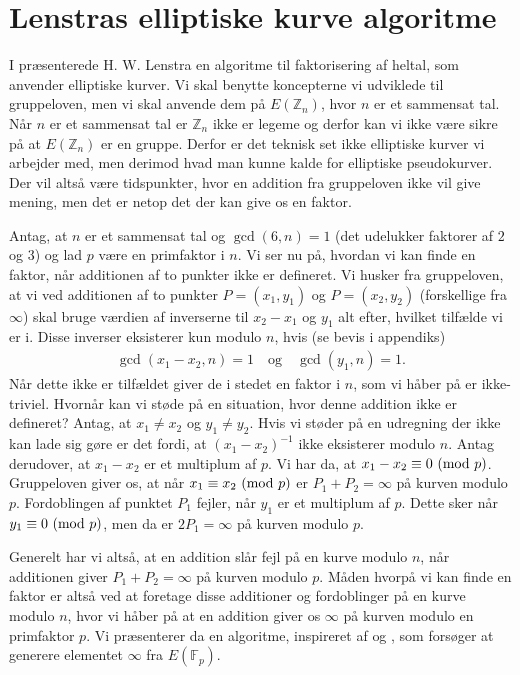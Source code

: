 \section{Lenstras elliptiske kurve algoritme}
I \cite{Lenstra} præsenterede H. W. Lenstra en algoritme til faktorisering af heltal, som anvender elliptiske kurver. Vi skal benytte koncepterne vi udviklede til gruppeloven, men vi skal anvende dem på $E(\mathbb{Z}_n)$, hvor $n$ er et sammensat tal. Når $n$ er et sammensat tal er $\mathbb{Z}_n$ ikke er legeme og derfor kan vi ikke være sikre på at $E(\mathbb{Z}_n)$ er en gruppe. Derfor er det teknisk set ikke elliptiske kurver vi arbejder med, men derimod hvad man kunne kalde for elliptiske pseudokurver. Der vil altså være tidspunkter, hvor en addition fra gruppeloven ikke vil give mening, men det er netop det der kan give os en faktor.

Antag, at $n$ er et sammensat tal og $\gcd(6, n) = 1$ (det udelukker faktorer af $2$ og $3$) og lad $p$ være en primfaktor i $n$. 
Vi ser nu på, hvordan vi kan finde en faktor, når additionen af to punkter ikke er defineret. Vi husker fra gruppeloven, at vi ved additionen af to punkter $P=(x_1, y_1)$ og $P=(x_2, y_2)$ (forskellige fra $\infty$) skal bruge værdien af inverserne til $x_2 - x_1$ og $y_1$ alt efter, hvilket tilfælde vi er i. Disse inverser eksisterer kun modulo $n$, hvis (se bevis i appendiks)
\begin{align*}
	\gcd(x_1 - x_2, n) = 1 \quad \text{og} \quad \gcd(y_1, n) = 1.
\end{align*}
Når dette ikke er tilfældet giver de i stedet en faktor i $n$, som vi håber på er ikke-triviel.
Hvornår kan vi støde på en situation, hvor denne addition ikke er defineret? Antag, at $x_1 \neq x_2$ og $y_1 \neq y_2$. Hvis vi støder på en udregning der ikke kan lade sig gøre er det fordi, at $(x_1-x_2)^{-1}$ ikke eksisterer modulo $n$. Antag derudover, at $x_1 - x_2$ er et multiplum af $p$. Vi har da, at $x_1 - x_2 \equiv 0 \ (\mathrm{mod} \ p)$. Gruppeloven giver os, at når $x_1 \equiv x_2 \ (\mathrm{mod} \ p)$ er $P_1 + P_2 = \infty$ på kurven modulo $p$.
Fordoblingen af punktet $P_1$ fejler, når $y_1$ er et multiplum af $p$. Dette sker når $y_1 \equiv 0 \ (\mathrm{mod} \ p)$, men da er $2P_1 = \infty$ på kurven modulo $p$.

Generelt har vi altså, at en addition slår fejl på en kurve modulo $n$, når additionen giver $P_1 + P_2 = \infty$ på kurven modulo $p$. Måden hvorpå vi kan finde en faktor er altså ved at foretage disse additioner og fordoblinger på en kurve modulo $n$, hvor vi håber på at en addition giver os $\infty$ på kurven modulo en primfaktor $p$. Vi præsenterer da en algoritme, inspireret af \cite{Silverman} og \cite{Washington}, som forsøger at generere elementet $\infty$ fra $E(\mathbb{F}_p)$.

